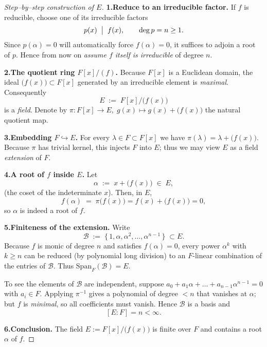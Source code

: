 \documentclass[12pt]{article}
\theoremstyle{definition} %
\theoremstyle{plain} %
\begin{document}
  \begin{proof}[Step–by–step construction of \(E\)]
  \textbf{1.\;Reduce to an irreducible factor.}
  If \(f\) is reducible, choose one of its irreducible factors
  \[
        p(x)\;\bigm|\;f(x), \qquad
        \deg p = n\ge 1 .
  \]
  Since \(p(\alpha)=0\) will automatically force \(f(\alpha)=0\),
  it suffices to adjoin a root of \(p\).
  Hence from now on \emph{assume \(f\) itself is irreducible} of degree
  \(n\).
  
  \smallskip
  \textbf{2.\;The quotient ring \(F[x]/(f)\).}
  Because \(F[x]\) is a Euclidean domain,
  the ideal \(\bigl(f(x)\bigr)\subset F[x]\) generated by an
  irreducible element is \emph{maximal}.
  Consequently
  \[
        E \;:=\; F[x]\bigl/\!\bigl(f(x)\bigr)
  \]
  is a \emph{field}.  
  Denote by
  \(
        \pi : F[x]\to E,\;
        g(x)\longmapsto g(x)+\bigl(f(x)\bigr)
  \)
  the natural quotient map.
  
  \smallskip
  \textbf{3.\;Embedding \(F\hookrightarrow E\).}
  For every \(\lambda\in F\subset F[x]\) we have
  \(
        \pi(\lambda)=\lambda+\bigl(f(x)\bigr).
  \)
  Because \(\pi\) has trivial kernel, this injects \(F\) into \(E\);
  thus we may view \(E\) as a field \emph{extension} of \(F\).
  
  \smallskip
  \textbf{4.\;A root of \(f\) inside \(E\).}
  Let
  \[
        \alpha\;:=\;x+\bigl(f(x)\bigr)\;\in\;E ,
  \]
  (the coset of the indeterminate \(x\)).
  Then, in \(E\),
  \[
        f(\alpha)\;=\;\pi\!\bigl(f(x)\bigr)=
        f(x)+\bigl(f(x)\bigr)=0,
  \]
  so \(\alpha\) is indeed a root of \(f\).
  
  \smallskip
  \textbf{5.\;Finiteness of the extension.}
  Write
  \[
        \mathcal{B}\;:=\;\{\,1,\alpha,\alpha^{2},\dots,\alpha^{n-1}\,\}\;\subset E.
  \]
  Because \(f\) is monic of degree \(n\) and satisfies
  \(f(\alpha)=0\), every power \(\alpha^{k}\) with \(k\ge n\) can be
  reduced (by polynomial long division) to an \(F\)-linear
  combination of the entries of \(\mathcal{B}\).
  Thus \(\text{Span}_{F}(\mathcal{B}) = E\).
  
  To see the elements of \(\mathcal{B}\) are independent, suppose
  \(
        a_{0}+a_{1}\alpha+\dots+a_{n-1}\alpha^{n-1}=0
  \)
  with \(a_{i}\in F\).  
  Applying \(\pi^{-1}\) gives a polynomial of degree \(<n\) that
  vanishes at \(\alpha\); but \(f\) is \emph{minimal}, so all
  coefficients must vanish.  
  Hence \(\mathcal{B}\) is a basis and
  \[
        [E:F]=n<\infty .
  \]
  
  \smallskip
  \textbf{6.\;Conclusion.}
  The field \(E:=F[x]/\bigl(f(x)\bigr)\) is finite over \(F\)
  and contains a root \(\alpha\) of \(f\).
  \end{proof}
\end{document}
